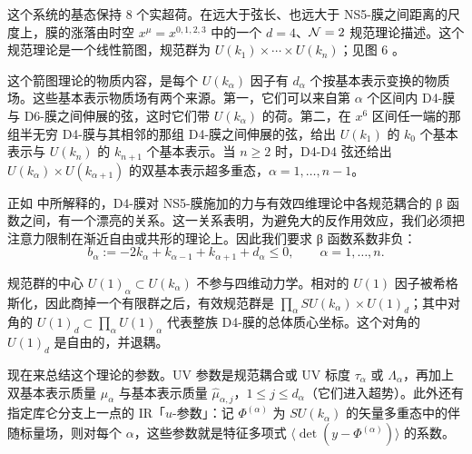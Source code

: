 
这个系统的基态保持 $8$ 个实超荷。在远大于弦长、也远大于 NS5-膜之间距离的尺度上，膜的涨落由时空 $x^\mu = x^{0,1,2,3}$ 中的一个 $d=4$、$\mathcal{N}=2$ 规范理论描述。这个规范理论是一个线性箭图，规范群为 $U(k_1) \times\cdots \times U(k_n)$；见图 6%
。


这个箭图理论的物质内容，是每个 $U(k_\alpha)$ 因子有 $d_\alpha$ 个按基本表示变换的物质场。这些基本表示物质场有两个来源。第一，它们可以来自第 $\alpha$ 个区间内 D4-膜与 D6-膜之间伸展的弦，这时它们带 $U(k_\alpha)$ 的荷。第二，在 $x^6$ 区间任一端的那组半无穷 D4-膜与其相邻的那组 D4-膜之间伸展的弦，给出 $U(k_1)$ 的 $k_0$ 个基本表示与 $U(k_n)$ 的 $k_{n+1}$ 个基本表示。当 $n\geq 2$ 时，D4-D4 弦还给出 $U(k_\alpha) \times U(k_{\alpha+1})$ 的双基本表示超多重态，$\alpha = 1, \dots, n-1$。

正如 \cite{Witten:1997sc} 中所解释的，D4-膜对 NS5-膜施加的力与有效四维理论中各规范耦合的 β 函数之间，有一个漂亮的关系。这一关系表明，为避免大的反作用效应，我们必须把注意力限制在渐近自由或共形的理论上。因此我们要求 β 函数系数非负：
\begin{equation}
\label{eq:NegBetas}
b_\alpha:=  - 2k_\alpha  + k_{\alpha-1} +  k_{\alpha +1} +  d_\alpha \leq 0 , \qquad \alpha=1,\dots, n.
\end{equation}

规范群的中心 $U(1)_\alpha \subset U(k_\alpha)$ 不参与四维动力学。相对的 $U(1)$ 因子被希格斯化，因此商掉一个有限群之后，有效规范群是 $\prod_{\alpha} SU(k_\alpha)\times U(1)_d$；其中对角的 $U(1)_d \subset \prod_{\alpha} U(1)_{\alpha}$ 代表整族 D4-膜的总体质心坐标。这个对角的 $U(1)_d$ 是自由的，并退耦。

现在来总结这个理论的参数。UV 参数是规范耦合或 UV 标度 $\tau_\alpha$ 或 $\Lambda_\alpha$，再加上双基本表示质量 $\mu_\alpha$ 与基本表示质量 $\hat \mu_{\alpha,j}$，$1 \leq j \leq d_\alpha$（它们进入超势）。此外还有指定库仑分支上一点的 IR「$u$-参数」：记 $\Phi^{(\alpha)}$ 为 $SU(k_\alpha)$ 的矢量多重态中的伴随标量场，则对每个 $\alpha$，这些参数就是特征多项式 $\langle \det(y - \Phi^{(\alpha)}) \rangle$ 的系数。

